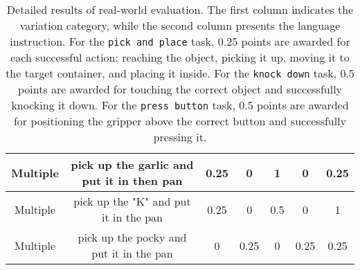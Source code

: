 \begin{table}
{\begin{tabular}{|c|c|c|c|c|c|c|}
Multiple & pick up the garlic and put it in then pan & 0.25 & 0 & 1 & 0 & 0.25 \\ \hline
Multiple & pick up the "K" and put it in the pan & 0.25 & 0 & 0.5 & 0 & 1 \\ \hline
Multiple & pick up the pocky and put it in the pan & 0 & 0.25 & 0 & 0.25 & 0.25 \\ \hline
\end{tabular}}
    \caption{Detailed results of real-world evaluation. The first column indicates the variation category, while the second column presents the language instruction. For the \texttt{pick and place} task, 0.25 points are awarded for each successful action: reaching the object, picking it up, moving it to the target container, and placing it inside. For the \texttt{knock down} task, 0.5 points are awarded for touching the correct object and successfully knocking it down. For the \texttt{press button} task, 0.5 points are awarded for positioning the gripper above the correct button and successfully pressing it.}
    \label{table:detailed_real}
\end{table}